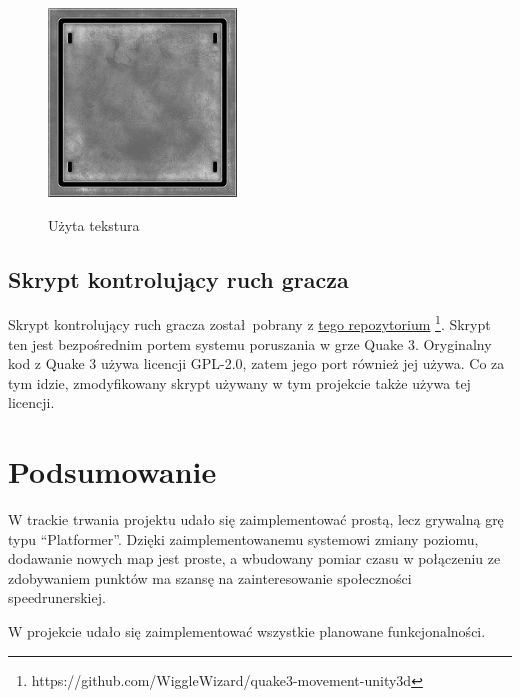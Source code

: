 \documentclass[10pt,a4paper]{article}
\begin{document}
\begin{figure}[ht]
	\centering
	\includegraphics[height=5cm]{../Assets/Textures/mtl_o_s.png}
	\label{fig:mtlo}
	\caption{Użyta tekstura}
\end{figure}

\subsection{Skrypt kontrolujący ruch gracza}\label{sec:quake-movement}

Skrypt kontrolujący ruch gracza został pobrany z
\href{https://github.com/WiggleWizard/quake3-movement-unity3d}{tego repozytorium}
\footnote{https://github.com/WiggleWizard/quake3-movement-unity3d}.
Skrypt ten jest bezpośrednim portem systemu poruszania w grze Quake 3. Oryginalny
kod z Quake 3 używa licencji GPL-2.0, zatem jego port również jej używa. Co za
tym idzie, zmodyfikowany skrypt używany w tym projekcie także używa tej
licencji.

\section{Podsumowanie}
W trackie trwania projektu udało się zaimplementować prostą, lecz grywalną grę
typu ``Platformer''. Dzięki zaimplementowanemu systemowi zmiany poziomu,
dodawanie nowych map jest proste, a wbudowany pomiar czasu w połączeniu ze
zdobywaniem punktów ma szansę na zainteresowanie społeczności speedrunerskiej.

W projekcie udało się zaimplementować wszystkie planowane funkcjonalności.
\end{document}
